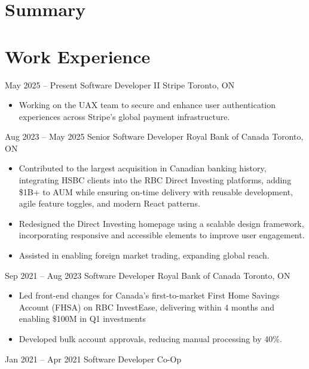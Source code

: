 \documentclass[letterpaper]{moderncv}
\begin{document}
\makecvtitle

\section{Summary}

\section{Work Experience}
\cventry
{May 2025 -- Present}
{Software Developer II}
{Stripe}
{Toronto, ON}
{}
{\begin{itemize}%
	\item Working on the UAX team to secure and enhance user authentication experiences across Stripe's global payment infrastructure.
	\end{itemize}}
\cventry
{Aug 2023 -- May 2025}
{Senior Software Developer}
{Royal Bank of Canada}
{Toronto, ON}
{}
{\begin{itemize}%
	\item Contributed to the largest acquisition in Canadian banking history, integrating HSBC clients into the RBC Direct Investing platforms, adding \$1B+ to AUM while ensuring on-time delivery with reusable development, agile feature toggles, and modern React patterns.
	\item Redesigned the Direct Investing homepage using a scalable design framework, incorporating responsive and accessible elements to improve user engagement.
	\item Assisted in enabling foreign market trading, expanding global reach.
	\end{itemize}}
\cventry
{Sep 2021 -- Aug 2023}
{Software Developer}
{Royal Bank of Canada}
{Toronto, ON}
{}
{\begin{itemize}%
	\item Led front-end changes for Canada's first-to-market First Home Savings Account (FHSA) on RBC InvestEase, delivering within 4 months and enabling \$100M in Q1 investments
	\item Developed bulk account approvals, reducing manual processing by 40\%.
	\end{itemize}}
\cventry
{Jan 2021 -- Apr 2021}
{Software Developer Co-Op}
\end{document}
